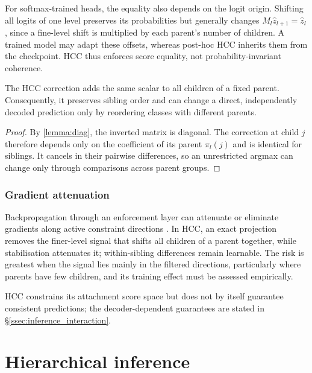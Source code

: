 For softmax-trained heads, the equality also depends on the logit origin.
Shifting all logits of one level preserves its probabilities but generally
changes $M_l\hat z_{l+1}=\hat z_l$, since a fine-level shift is multiplied by
each parent's number of children. A trained model may adapt these offsets,
whereas post-hoc HCC inherits them from the checkpoint. HCC thus enforces score
equality, not probability-invariant coherence.

\begin{corollary}
\label{cor:hcc_sibling_shift}
The HCC correction adds the same scalar to all children of a fixed parent.
Consequently, it preserves sibling order and can change a direct, independently
decoded prediction only by reordering classes with different parents.
\end{corollary}
\begin{proof}
By \cref{lemma:diag}, the inverted matrix is diagonal. The correction at child
$j$ therefore depends only on the coefficient of its parent $\pi_l(j)$ and is
identical for siblings. It cancels in their pairwise differences, so an
unrestricted argmax can change only through comparisons across parent groups.
\end{proof}

\subsubsection{Gradient attenuation}
\label{ssec:hcc_gradient_cost}

Backpropagation through an enforcement layer can attenuate or eliminate gradients
along active constraint directions \cite[Appendix~C]{min2024hardnet}. In HCC, an
exact projection removes the finer-level signal that shifts all children of a
parent together, while stabilisation attenuates it; within-sibling differences
remain learnable. The risk is greatest when the signal lies mainly in the
filtered directions, particularly where parents have few children, and its
training effect must be assessed empirically.

HCC constrains its attachment score space but does not by itself guarantee
consistent predictions; the decoder-dependent guarantees are stated in
\S\ref{ssec:inference_interaction}.

\section{Hierarchical inference}
\label{sec:methodology_inference}


